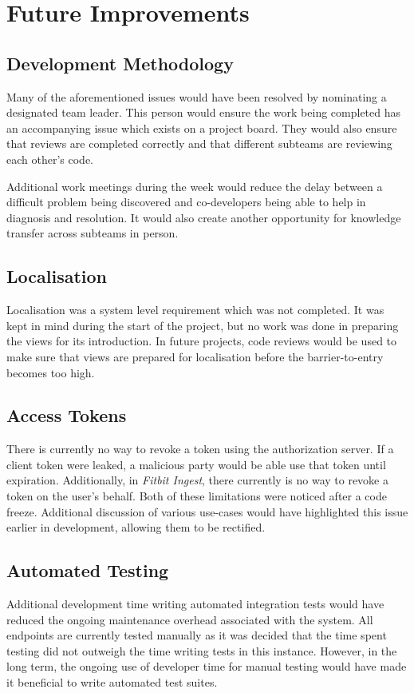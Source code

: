 \section{Future Improvements}

  \subsection{Development Methodology}
  Many of the aforementioned issues would have been resolved by nominating a designated team leader. This person would ensure the work being completed has an accompanying issue which exists on a project board. They would also ensure that reviews are completed correctly and that different subteams are reviewing each other's code.

  \par
  Additional work meetings during the week would reduce the delay between a difficult problem being discovered and co-developers being able to help in diagnosis and resolution. It would also create another opportunity for knowledge transfer across subteams in person.

  \subsection{Localisation}
  \par
  Localisation was a system level requirement which was not completed. It was kept in mind during the start of the project, but no work was done in preparing the views for its introduction. In future projects, code reviews would be used to make sure that views are prepared for localisation before the barrier-to-entry becomes too high.

  \subsection{Access Tokens}
  There is currently no way to revoke a token using the authorization server. If a client token were leaked, a malicious party would be able use that token until expiration. Additionally, in \textit{Fitbit Ingest}, there currently is no way to revoke a token on the user's behalf. Both of these limitations were noticed after a code freeze. Additional discussion of various use-cases would have highlighted this issue earlier in development, allowing them to be rectified.

  \subsection{Automated Testing}
  \par
  Additional development time writing automated integration tests would have reduced the ongoing maintenance overhead associated with the system. All endpoints are currently tested manually as it was decided that the time spent testing did not outweigh the time writing tests in this instance. However, in the long term, the ongoing use of developer time for manual testing would have made it beneficial to write automated test suites.

